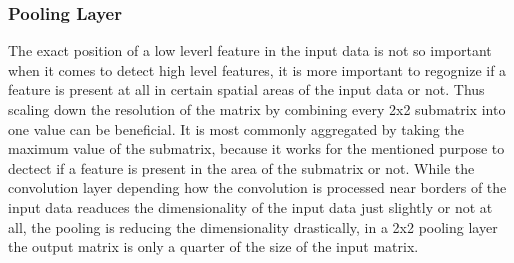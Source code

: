 \subsubsection*{Pooling Layer}

The exact position of a low leverl feature in the input data is not so important when it comes to detect high level features,
it is more important to regognize if a feature is present at all in certain spatial areas of the input data or not.
Thus scaling down the resolution of the matrix by combining every 2x2 submatrix into one value can be beneficial.
It is most commonly aggregated by taking the maximum value of the submatrix, because it works for the mentioned purpose to dectect if a feature is present in the area of the submatrix or not. While the convolution layer depending how the convolution is processed near borders of the input data readuces the dimensionality of the input data just slightly or not at all, the pooling is reducing the dimensionality drastically, in a 2x2 pooling layer the output matrix is only a quarter of the size of the input matrix.

